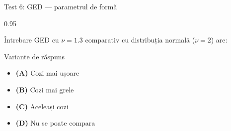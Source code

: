 \documentclass[9pt, aspectratio=169, t]{beamer}
\begin{document}
\begin{frame}{Test 6: GED --- parametrul de formă}
    \begin{cminipage}{0.95\textwidth}
    \begin{alertblock}{Întrebare}
        GED cu $\nu = 1.3$ comparativ cu distribuția normală ($\nu = 2$) are:
    \end{alertblock}
    \begin{block}{Variante de răspuns}
    \begin{itemize}\setlength{\itemsep}{0pt}
        \item \textcolor{MainBlue}{\textbf{(A)}} Cozi mai ușoare
        \item \textcolor{MainBlue}{\textbf{(B)}} Cozi mai grele
        \item \textcolor{MainBlue}{\textbf{(C)}} Aceleași cozi
        \item \textcolor{MainBlue}{\textbf{(D)}} Nu se poate compara
    \end{itemize}
    \end{block}
    \end{cminipage}
\end{frame}
\end{document}
